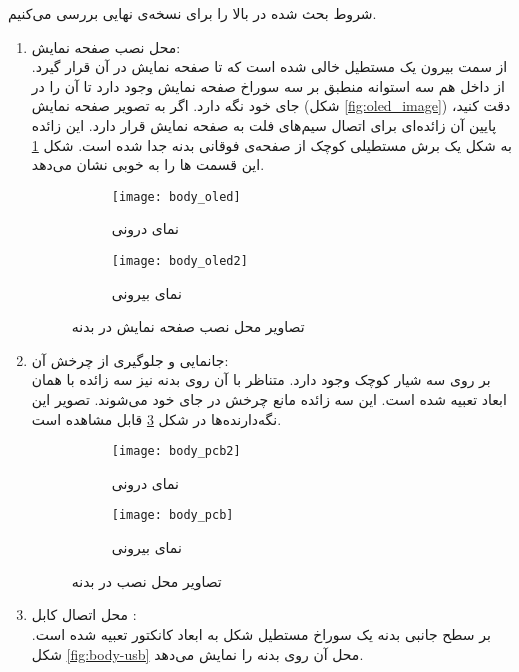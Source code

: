 شروط بحث شده در بالا را برای نسخه‌ی نهایی بررسی می‌کنیم.
\begin{enumerate}
	\item محل نصب صفحه نمایش: \\
	از سمت بیرون یک مستطیل خالی شده است که تا صفحه نمایش در آن قرار گیرد. از داخل هم سه استوانه منطبق بر سه سوراخ صفحه نمایش وجود دارد تا آن را در جای خود نگه دارد. اگر به تصویر صفحه نمایش (شکل \ref{fig:oled_image}) دقت کنید، پایین آن زائده‌ای برای اتصال سیم‌های فلت به صفحه نمایش قرار دارد. این زائده به شکل یک برش مستطیلی کوچک از صفحه‌ی فوقانی بدنه جدا شده است. شکل \ref{fig:body-oled} این قسمت ها را به خوبی نشان می‌دهد.
	
	\begin{figure}[h]
		\centering
		\begin{subfigure}{0.45\textwidth}
			\centering
			\texttt{[image: body\_oled]}
			\caption{نمای درونی}
		\end{subfigure}
		\begin{subfigure}{0.47\textwidth}
			\centering
			\texttt{[image: body\_oled2]}
			\caption{نمای بیرونی}
		\end{subfigure}
		\caption{تصاویر محل نصب صفحه نمایش در بدنه}
		\label{fig:body-oled}
	\end{figure}

	\item  جانمایی \pcbf و جلوگیری از چرخش آن: \\
	بر روی \pcbf سه شیار کوچک وجود دارد. متناظر با آن روی بدنه نیز سه زائده با همان ابعاد تعبیه شده است. این سه زائده مانع چرخش \pcbf در جای خود می‌شوند. تصویر این نگه‌دارنده‌ها در شکل \ref{fig:body-pcb} قابل مشاهده است.
	
	\begin{figure}[h]
		\centering
		\begin{subfigure}{0.44\textwidth}
			\centering
			\texttt{[image: body\_pcb2]}
			\caption{نمای درونی}
		\end{subfigure}
		\begin{subfigure}{0.44\textwidth}
			\centering
			\texttt{[image: body\_pcb]}
			\caption{نمای بیرونی}
			\label{fig:body-pcb-out}
		\end{subfigure}
		\caption{تصاویر محل نصب \pcbf در بدنه}
		\label{fig:body-pcb}
	\end{figure}
	
	\item محل اتصال کابل : \\
	بر سطح جانبی بدنه یک سوراخ مستطیل شکل به ابعاد کانکتور  تعبیه شده است. شکل \ref{fig:body-usb} محل آن روی بدنه را نمایش می‌دهد.


\end{enumerate}
